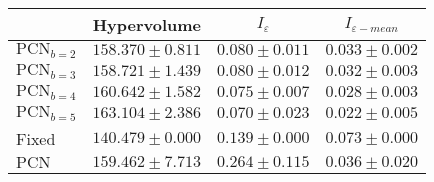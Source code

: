 
\begin{tabular}{|l|c|c|c|}
    \hline
        & Hypervolume & $I_\varepsilon$ & $I_{\varepsilon-mean}$ \\
    \hline
    $\text{PCN}_{b=2}$ & $158.370 \pm 0.811$ & $0.080 \pm 0.011$ & $0.033 \pm 0.002$ \\
    \hline
    $\text{PCN}_{b=3}$ & $158.721 \pm 1.439$ & $0.080 \pm 0.012$ & $0.032 \pm 0.003$ \\
    \hline
    $\text{PCN}_{b=4}$ & $160.642 \pm 1.582$ & $0.075 \pm 0.007$ & $0.028 \pm 0.003$ \\
    \hline
    $\text{PCN}_{b=5}$ & $163.104 \pm 2.386$ & $0.070 \pm 0.023$ & $0.022 \pm 0.005$ \\
    \hline
    Fixed & $140.479 \pm 0.000$ & $0.139 \pm 0.000$ & $0.073 \pm 0.000$ \\
    \hline
    $\text{PCN}$ & $159.462 \pm 7.713$ & $0.264 \pm 0.115$ & $0.036 \pm 0.020$ \\
    \hline
\end{tabular}
